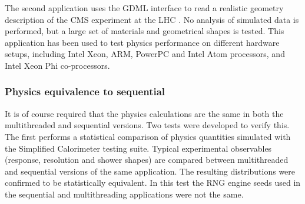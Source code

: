 The second application uses the \Gfour{} GDML interface\cite{MT:GDML} to
read a realistic geometry description of the CMS experiment at the LHC 
\cite{MT:collaboration2008cms}.  No analysis of simulated data is performed, but
a large set of materials and geometrical shapes is tested.  This application has
been used to test physics performance on different hardware setups, including 
Intel Xeon, ARM, PowerPC and Intel Atom processors, and Intel Xeon Phi 
co-processors.


\subsubsection{Physics equivalence to sequential}
It is of course required that the physics calculations are the same in both the
multithreaded and sequential versions.  Two tests were developed to verify this.
The first performs a statistical comparison of physics quantities simulated with
the Simplified Calorimeter testing suite.  Typical experimental observables 
(response, resolution and shower shapes) are compared between multithreaded
and sequential versions of the same application.  The resulting distributions 
were confirmed to be statistically equivalent. In this test the RNG engine seeds
used in the sequential and multithreading applications were not the same.

